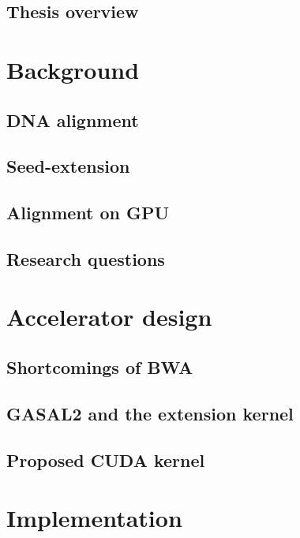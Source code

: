 \documentclass[11pt,twoside]{ce}
\begin{document}
\section{Thesis overview}


\chapter{Background}
\label{chap:background}
\section{DNA alignment}


\section{Seed-extension}


\section{Alignment on GPU}


\section{Research questions}


\chapter{Accelerator design}
\label{chap:accel}


\section{Shortcomings of BWA}

\section{GASAL2 and the extension kernel}
	

\section{Proposed CUDA kernel}


\chapter{Implementation}
\label{chap:implementation}

\end{document}
